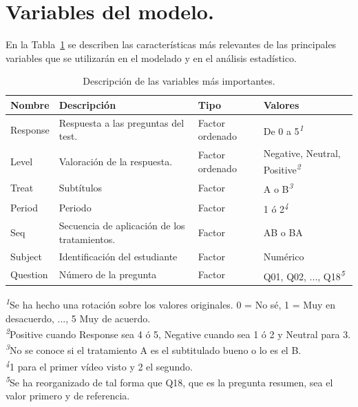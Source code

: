 \documentclass[
  12pt,
  a4paper,
  extrafontsizes,
  onecolumn,
  openright,
  table]{memoir}
\begin{document}
\hypertarget{variables}{%
\section{Variables del modelo.}\label{variables}}

En la Tabla~\ref{tbl-variables} se describen las características más
relevantes de las principales variables que se utilizarán en el modelado
y en el análisis estadístico.

\footnotesize

\hypertarget{tbl-variables}{}
\setlength{\LTpost}{0mm}
\begin{longtable}{llll}
\caption{\label{tbl-variables}Descripción de las variables más importantes. }\tabularnewline

\toprule
Nombre & Descripción & Tipo & Valores \\ 
\midrule
Response & Respuesta a las preguntas del test. & Factor ordenado & De 0 a 5\textsuperscript{\textit{1}} \\ 
Level & Valoración de la respuesta. & Factor ordenado & Negative, Neutral, Positive\textsuperscript{\textit{2}} \\ 
Treat & Subtítulos & Factor & A o B\textsuperscript{\textit{3}} \\ 
Period & Periodo & Factor & 1 ó 2\textsuperscript{\textit{4}} \\ 
Seq & Secuencia de aplicación de los tratamientos. & Factor & AB o BA \\ 
Subject & Identificación del estudiante & Factor & Numérico \\ 
Question & Número de la pregunta & Factor & Q01, Q02, ..., Q18\textsuperscript{\textit{5}} \\ 
\bottomrule
\end{longtable}
\begin{minipage}{\linewidth}
\textsuperscript{\textit{1}}Se ha hecho una rotación sobre los valores originales. 0 = No sé, 1 = Muy en desacuerdo, ..., 5 Muy de acuerdo.\\
\textsuperscript{\textit{2}}Positive cuando Response sea 4 ó 5, Negative cuando sea 1 ó 2 y Neutral para 3.\\
\textsuperscript{\textit{3}}No se conoce si el tratamiento A es el subtitulado bueno o lo es el B.\\
\textsuperscript{\textit{4}}1 para el primer vídeo visto y 2 el segundo.\\
\textsuperscript{\textit{5}}Se ha reorganizado de tal forma que Q18, que es la pregunta resumen, sea el valor primero y de referencia.\\
\end{minipage}
\end{document}
